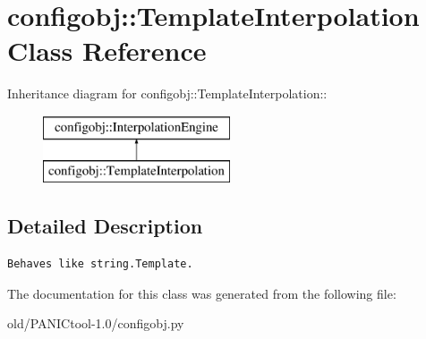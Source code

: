 \section{configobj::Template\-Interpolation Class Reference}
\label{classconfigobj_1_1TemplateInterpolation}
Inheritance diagram for configobj::Template\-Interpolation::\begin{figure}[H]
\begin{center}
\leavevmode
\includegraphics[height=2cm]{classconfigobj_1_1TemplateInterpolation}
\end{center}
\end{figure}


\subsection{Detailed Description}


\footnotesize\begin{verbatim}Behaves like string.Template.\end{verbatim}
\normalsize
 



The documentation for this class was generated from the following file:\begin{CompactItemize}
\item 
old/PANICtool-1.0/configobj.py\end{CompactItemize}
